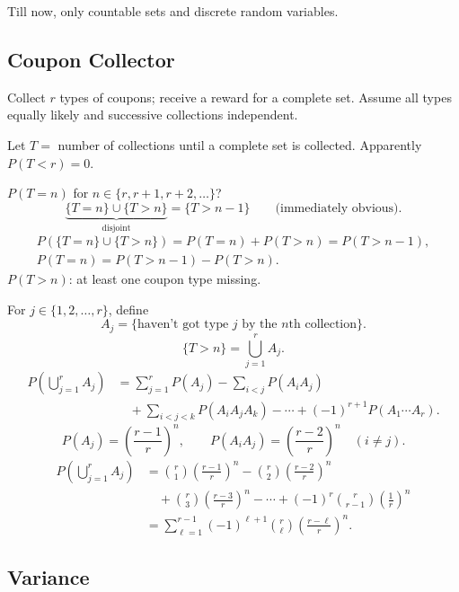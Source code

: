 Till now, only countable sets and discrete random variables.

\subsection{Coupon Collector}

\begin{example}
  Collect $r$ types of coupons; receive a reward for a complete set.
  Assume all types equally likely and successive collections independent.

  Let $T=$ number of collections until a complete set is collected.
  Apparently $P(T<r)=0$.

  $P(T=n)$ for $n\in\{r,r+1,r+2,\ldots\}$?
  \[
    \underbrace{\{T=n\}\cup\{T>n\}}_{\text{disjoint}}=\{T>n-1\}
    \qquad\text{(immediately obvious)}.
  \]
  \begin{gather*}
    P(\{T=n\}\cup\{T>n\})=P(T=n)+P(T>n)=P(T>n-1),\\
    P(T=n)=P(T>n-1)-P(T>n).
  \end{gather*}
  $P(T>n)$: at least one coupon type missing.

  For $j\in\{1,2,\ldots,r\}$, define
  \[
    A_j=\{\text{haven't got type }j\text{ by the }n\text{th collection}\}.
  \]
  \[
    \{T>n\}=\bigcup_{j=1}^r A_j.
  \]
  \begin{align*}
    P\left(\bigcup_{j=1}^r A_j\right)
     & =\sum_{j=1}^r P(A_j)-\sum_{i<j}P(A_iA_j) \\
     & \quad+\sum_{i<j<k}P(A_iA_jA_k)-\cdots
    +(-1)^{r+1}P(A_1\cdots A_r).
  \end{align*}
  \[
    P(A_j)=\left(\frac{r-1}{r}\right)^n,\qquad
    P(A_iA_j)=\left(\frac{r-2}{r}\right)^n\quad(i\ne j).
  \]
  \begin{align*}
    P\left(\bigcup_{j=1}^r A_j\right)
     & =\binom r1\left(\frac{r-1}{r}\right)^n
    -\binom r2\left(\frac{r-2}{r}\right)^n                \\
     & \quad+\binom r3\left(\frac{r-3}{r}\right)^n-\cdots
    +(-1)^r\binom r{r-1}\left(\frac1r\right)^n            \\
     & =\sum_{\ell=1}^{r-1}(-1)^{\ell+1}\binom r\ell
    \left(\frac{r-\ell}{r}\right)^n.
  \end{align*}
\end{example}

\subsection{Variance}

